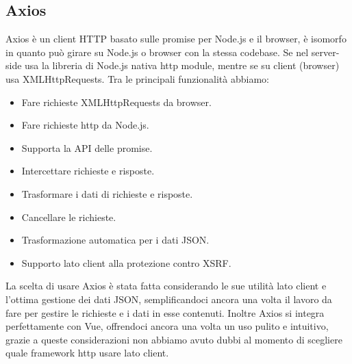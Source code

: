 \documentclass{article}
\begin{document}
\subsection{Axios}
Axios\cite{axios} è un client HTTP basato sulle promise per Node.js e il browser, è isomorfo in quanto può girare su Node.js o browser con la stessa codebase. Se nel server-side usa la libreria di Node.js nativa http module, mentre se su client (browser) usa XMLHttpRequests.
Tra le principali funzionalità abbiamo:
\begin{itemize}
	\item Fare richieste XMLHttpRequests da browser.
	\item Fare richieste http da Node.js.
	\item Supporta la API delle promise.
	\item Intercettare richieste e risposte.
	\item Trasformare i dati di richieste e risposte.
	\item Cancellare le richieste.
	\item Trasformazione automatica per i dati JSON.
	\item Supporto lato client alla protezione contro XSRF.
\end{itemize}
La scelta di usare Axios è stata fatta considerando le sue utilità lato client e l'ottima gestione dei dati JSON, semplificandoci ancora una volta il lavoro da fare per gestire le richieste e i dati in esse contenuti. Inoltre Axios si integra perfettamente con Vue, offrendoci ancora una volta un uso pulito e intuitivo, grazie a queste considerazioni non abbiamo avuto dubbi al momento di scegliere quale framework http usare lato client.
\end{document}
